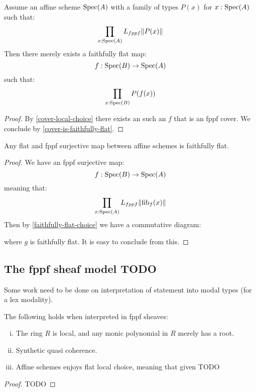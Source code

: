\begin{lemma}\label{faithfully-flat-choice}
Assume an affine scheme $\operatorname{Spec}(A)$ with a family of types $P(x)$ for $x:\operatorname{Spec}(A)$ such that:
\[\prod_{x:\operatorname{Spec}(A)}L_{fppf}\lVert P(x) \rVert\]
Then there merely exists a faithfully flat map:
\[f:\operatorname{Spec}(B)\to\operatorname{Spec}(A)\]
such that:
\[\prod_{x:\operatorname{Spec}(B)}P(f(x))\]
\end{lemma}

\begin{proof}
By \cref{cover-local-choice} there exists an such an $f$ that is an fppf cover. We conclude by \cref{cover-is-faithfully-flat}.
\end{proof}

\begin{proposition}
Any flat and fppf surjective map between affine schemes is faithfully flat.
\end{proposition}

\begin{proof}
We have an fppf surjective map:
\[f:\operatorname{Spec}(B)\to \operatorname{Spec}(A)\]
meaning that:
\[\prod_{x:\operatorname{Spec}(A)}L_{fppf}\lVert \mathrm{fib}_f(x) \rVert\]
Then by \cref{faithfully-flat-choice} we have a commutative diagram:
 \begin{center}
    \end{center}
where $g$ is faithfully flat. It is easy to conclude from this.
\end{proof}

\subsection{The fppf sheaf model TODO}

Some work need to be done on interpretation of statement into modal types (for a lex modality).

\begin{theorem}
The following holds when interpreted in fppf sheaves:
\begin{enumerate}[(i)]
\item The ring $R$ is local, and any monic polynomial in $R$ merely has a root.
\item Synthetic quasi coherence.
\item Affine schemes enjoys flat local choice, meaning that given TODO
\end{enumerate}
\end{theorem}

\begin{proof}
TODO
\end{proof}


